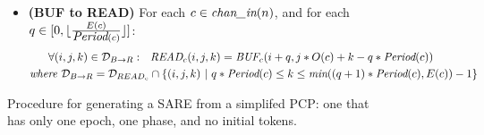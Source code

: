 \begin{figure}[ht]
{\begin{minipage}{6.3in}
\begin{itemize}
\begin{align}
  \mt{WRITE}_{c}(i, q, j - q * U(c)) \\ \nonumber
&\mt{where } {\cal D}_{W \rightarrow B}(c,q) = 
  {\cal D}_{{BUF}_{c}} \cap 
  \{ (i,j)~|~q*U(c) \le j \le (q+1)*U(c) - 1 \}
\end{align}
\item {\bf(BUF to READ)} For each $c \in \mbox{\it chan\_in}(n)$, 
       and for each $q \in [0, \lfloor \frac{E(c)}{\mbox{\it Period}(c)} \rfloor ]$:
\begin{align}
\label{eq:b2r}
&~~~~~\forall (i,j,k) \in {\cal D}_{B \rightarrow R}:~~
\mbox{\it READ}_{c}(i,j,k) = \mbox{\it BUF}_{c}(i+q,j*O(c) + k - q * \mbox{\it Period}(c)) \\ \nonumber
&\mbox{\it where }{\cal D}_{B \rightarrow R} = 
  {\cal D}_{READ_{c}} \cap \{ (i,j,k)~|~q * \mbox{\it Period}(c) \le k \le \mbox{\it min}((q+1)*\mbox{\it Period}(c), E(c)) - 1 \} 
\end{align}
\vspace{-12pt}
\end{itemize}
\end{minipage}}
\caption{Procedure for generating a SARE from a simplifed PCP:  one that has only one epoch, one phase, and no initial tokens.
\protect\label{fig:sdftosare}}
\end{figure}





